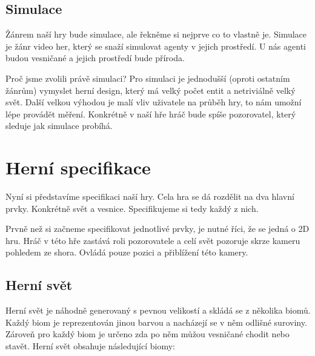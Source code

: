 
\subsection{Simulace}
Žánrem naší hry bude simulace, ale řekněme si nejprve co to vlastně je. Simulace je žánr video her, který se snaží simulovat agenty v jejich prostředí. U nás agenti budou vesničané a jejich prostředí bude příroda.

Proč jsme zvolili právě simulaci? Pro simulaci je jednodušší (oproti ostatním žánrům) vymyslet herní design, který má velký počet entit a netriviálně velký svět. Další velkou výhodou je malí vliv uživatele na průběh hry, to nám umožní lépe provádět měření. Konkrétně v naší hře hráč bude spíše pozorovatel, který sleduje jak simulace probíhá.


\section{Herní specifikace}
Nyní si představíme specifikaci naší hry. Cela hra se dá rozdělit na dva hlavní prvky. Konkrétně svět a vesnice. Specifikujeme si tedy každý z nich.

Prvně než si začneme specifikovat jednotlivé prvky, je nutné říci, že se jedná o 2D hru. Hráč v této hře zastává roli pozorovatele a celí svět pozoruje skrze kameru pohledem ze shora. Ovládá pouze pozici a přiblížení této kamery.

\subsection{Herní svět}
Herní svět je náhodně generovaný s pevnou velikostí a skládá se z několika biomů. Každý biom je reprezentován jinou barvou a nacházejí se v něm odlišné suroviny. Zároveň pro každý biom je určeno zda po něm můžou vesničané chodit nebo stavět. Herní svět obsahuje následující biomy:

